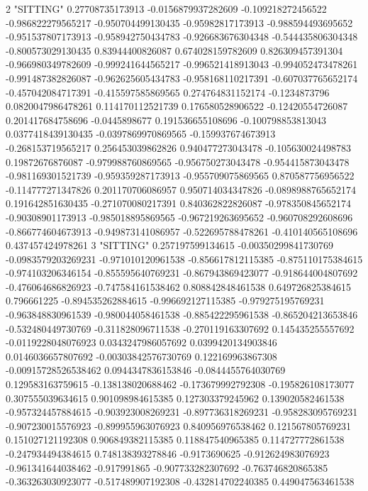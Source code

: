 2 "SITTING" 0.27708735173913 -0.0156879937282609 -0.109218272456522 -0.986822279565217 -0.950704499130435 -0.95982817173913 -0.988594493695652 -0.951537807173913 -0.958942750434783 -0.926683676304348 -0.544435806304348 -0.800573029130435 0.83944400826087 0.674028159782609 0.826309457391304 -0.966980349782609 -0.999241644565217 -0.996521418913043 -0.994052473478261 -0.991487382826087 -0.962625605434783 -0.958168110217391 -0.607037765652174 -0.457042084717391 -0.415597585869565 0.274764831152174 -0.1234873796 0.0820047986478261 0.114170112521739 0.176580528906522 -0.12420554726087 0.201417684758696 -0.0445898677 0.191536655108696 -0.100798853813043 0.0377418439130435 -0.0397869970869565 -0.159937674673913 -0.268153719565217 0.256453039862826 0.940477273043478 -0.105630024498783 0.19872676876087 -0.979988760869565 -0.956750273043478 -0.954415873043478 -0.981169301521739 -0.959359287173913 -0.955709075869565 0.870587756956522 -0.114777271347826 0.201170706086957 0.950714034347826 -0.0898988765652174 0.191642851630435 -0.271070080217391 0.840362822826087 -0.978350845652174 -0.90308901173913 -0.985018895869565 -0.967219263695652 -0.960708292608696 -0.866774604673913 -0.949873141086957 -0.522695788478261 -0.410140565108696 0.437457424978261
3 "SITTING" 0.257197599134615 -0.00350299841730769 -0.0983579203269231 -0.971010120961538 -0.856617812115385 -0.875110175384615 -0.974103206346154 -0.855595640769231 -0.867943869423077 -0.918644004807692 -0.476064686826923 -0.747584161538462 0.808842848461538 0.649726825384615 0.796661225 -0.894535262884615 -0.996692127115385 -0.979275195769231 -0.963848830961539 -0.980044058461538 -0.885422295961538 -0.865204213653846 -0.532480449730769 -0.311828096711538 -0.270119163307692 0.145435255557692 -0.0119228048076923 0.0343247986057692 0.0399420134903846 0.0146036657807692 -0.00303842576730769 0.122169963867308 -0.00915728526538462 0.0944347836153846 -0.0844455764030769 0.129583163759615 -0.138138020688462 -0.173679992792308 -0.195826108173077 0.307555039634615 0.901098984615385 0.127303379245962 0.139020582461538 -0.957324457884615 -0.903923008269231 -0.897736318269231 -0.958283095769231 -0.907230015576923 -0.899955963076923 0.840956976538462 0.121567805769231 0.151027121192308 0.906849382115385 0.118847540965385 0.114727772861538 -0.247934494384615 0.748138393278846 -0.9173690625 -0.912624983076923 -0.961341644038462 -0.917991865 -0.907733282307692 -0.763746820865385 -0.363263030923077 -0.517489907192308 -0.432814702240385 0.449047563461538
